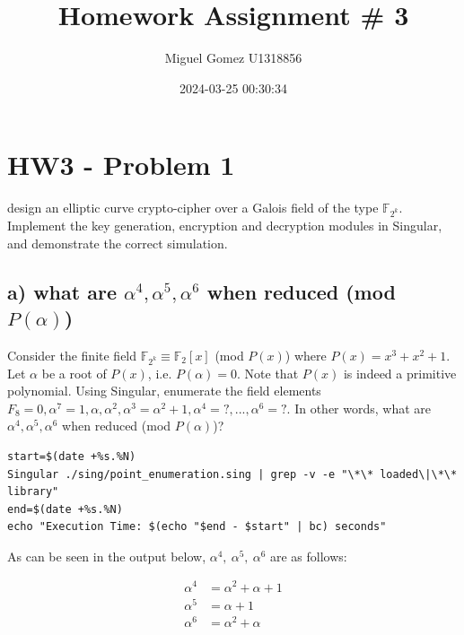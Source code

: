 \documentclass[a4paper,11pt]{exam}
\author{Miguel Gomez U1318856}
\date{2024-03-25 00:30:34}
\title{Homework Assignment \# 3}
\begin{document}
\maketitle
\tableofcontents

\newpage

\section{HW3 - Problem 1}
\label{sec:org8e7941e}
design an elliptic curve crypto-cipher over a Galois field of the type \(\mathbb{F}_{2^k}\).  Implement the key generation, encryption and decryption modules in Singular, and demonstrate the correct simulation.
\subsection{a) what are \(\alpha^4 , \alpha^5 , \alpha^6\) when reduced (mod \(P(\alpha)\))}
\label{sec:org6c04178}
Consider the finite field \(\mathbb{F}_{2^k} \equiv \mathbb{F}_{2}[x]\) (mod \(P(x)\)) where \(P(x) = x^3 + x^2 + 1\). Let \(\alpha\) be a root of \(P(x)\), i.e. \(P(\alpha) = 0\). Note that \(P(x)\) is indeed a primitive polynomial. Using Singular, enumerate the field elements \(F_8 = {0, \alpha^7 = 1, \alpha, \alpha^2, \alpha^3 = \alpha^2 + 1, \alpha^4 =?, . . . , \alpha^6 =?}\). In other words, what are \(\alpha^4 , \alpha^5 , \alpha^6\) when reduced (mod \(P(\alpha)\))?

\begin{verbatim}
start=$(date +%s.%N)
Singular ./sing/point_enumeration.sing | grep -v -e "\*\* loaded\|\*\* library"
end=$(date +%s.%N)
echo "Execution Time: $(echo "$end - $start" | bc) seconds"
\end{verbatim}

As can be seen in the output below, \(\alpha^4,\ \alpha^5,\ \alpha^6\) are as follows:

\begin{align*}
\alpha^4 &= \alpha^2+\alpha+1\\
\alpha^5 &= \alpha+1\\
\alpha^6 &= \alpha^2+\alpha
\end{align*}
\end{document}
